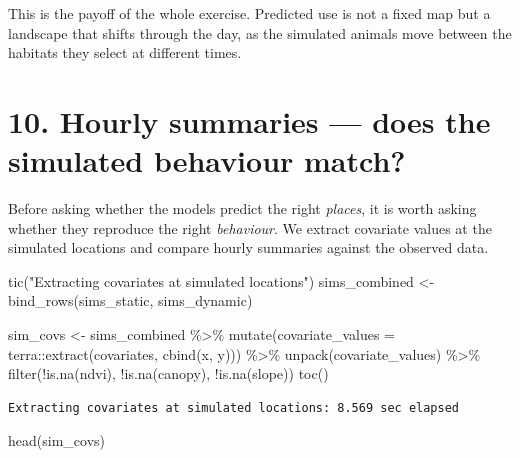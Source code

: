 \documentclass[
  letterpaper,
  DIV=11,
  numbers=noendperiod]{scrartcl}
\newenvironment{Shaded}{\begin{snugshade}}{\end{snugshade}}
\newcommand{\AttributeTok}[1]{\textcolor[rgb]{0.40,0.45,0.13}{#1}}
\newcommand{\FunctionTok}[1]{\textcolor[rgb]{0.28,0.35,0.67}{#1}}
\newcommand{\NormalTok}[1]{\textcolor[rgb]{0.00,0.23,0.31}{#1}}
\newcommand{\OtherTok}[1]{\textcolor[rgb]{0.00,0.23,0.31}{#1}}
\newcommand{\SpecialCharTok}[1]{\textcolor[rgb]{0.37,0.37,0.37}{#1}}
\newcommand{\StringTok}[1]{\textcolor[rgb]{0.13,0.47,0.30}{#1}}
\begin{document}
This is the payoff of the whole exercise. Predicted use is not a fixed
map but a landscape that shifts through the day, as the simulated
animals move between the habitats they select at different times.

\section{10. Hourly summaries --- does the simulated behaviour
match?}\label{hourly-summaries-does-the-simulated-behaviour-match}

Before asking whether the models predict the right \emph{places}, it is
worth asking whether they reproduce the right \emph{behaviour}. We
extract covariate values at the simulated locations and compare hourly
summaries against the observed data.

\begin{Shaded}
\begin{Highlighting}[]
\FunctionTok{tic}\NormalTok{(}\StringTok{"Extracting covariates at simulated locations"}\NormalTok{)}
\NormalTok{sims\_combined }\OtherTok{\textless{}{-}} \FunctionTok{bind\_rows}\NormalTok{(sims\_static, sims\_dynamic)}

\NormalTok{sim\_covs }\OtherTok{\textless{}{-}}\NormalTok{ sims\_combined }\SpecialCharTok{\%\textgreater{}\%}
  \FunctionTok{mutate}\NormalTok{(}\AttributeTok{covariate\_values =}\NormalTok{ terra}\SpecialCharTok{::}\FunctionTok{extract}\NormalTok{(covariates, }\FunctionTok{cbind}\NormalTok{(x, y))) }\SpecialCharTok{\%\textgreater{}\%}
  \FunctionTok{unpack}\NormalTok{(covariate\_values) }\SpecialCharTok{\%\textgreater{}\%}
  \FunctionTok{filter}\NormalTok{(}\SpecialCharTok{!}\FunctionTok{is.na}\NormalTok{(ndvi), }\SpecialCharTok{!}\FunctionTok{is.na}\NormalTok{(canopy), }\SpecialCharTok{!}\FunctionTok{is.na}\NormalTok{(slope))}
\FunctionTok{toc}\NormalTok{()}
\end{Highlighting}
\end{Shaded}

\begin{verbatim}
Extracting covariates at simulated locations: 8.569 sec elapsed
\end{verbatim}

\begin{Shaded}
\begin{Highlighting}[]
\FunctionTok{head}\NormalTok{(sim\_covs)}
\end{Highlighting}
\end{Shaded}
\end{document}
